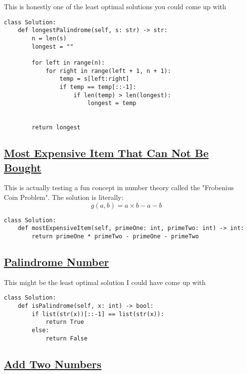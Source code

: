 \documentclass{article}
\begin{document}
This is honestly one of the least optimal solutions you could come up with

\begin{lstlisting}
class Solution:
    def longestPalindrome(self, s: str) -> str:
        n = len(s)
        longest = ""

        for left in range(n):
            for right in range(left + 1, n + 1):
                temp = s[left:right]
                if temp == temp[::-1]:
                    if len(temp) > len(longest):
                        longest = temp
            
        
        return longest
\end{lstlisting}

\subsection{\href{https://leetcode.com/problems/most-expensive-item-that-can-not-be-bought/description/?envType=company&envId=amazon&favoriteSlug=amazon-thirty-days}{Most Expensive Item That Can Not Be Bought}}


This is actually testing a fun concept in number theory called the "Frobenius Coin Problem". The solution is literally:
$$g(a,b) = a \times b - a - b$$

\begin{lstlisting}
class Solution:
    def mostExpensiveItem(self, primeOne: int, primeTwo: int) -> int:
        return primeOne * primeTwo - primeOne - primeTwo
\end{lstlisting}

\subsection{\href{https://leetcode.com/problems/palindrome-number/?envType=company&envId=amazon&favoriteSlug=amazon-thirty-days}{Palindrome Number}}


This might be the least optimal solution I could have come up with

\begin{lstlisting}
class Solution:
    def isPalindrome(self, x: int) -> bool:
        if list(str(x))[::-1] == list(str(x)):
            return True
        else:
            return False
\end{lstlisting}

\subsection{\href{https://leetcode.com/problems/add-two-numbers/?envType=company&envId=amazon&favoriteSlug=amazon-thirty-days}{Add Two Numbers}}
\end{document}
